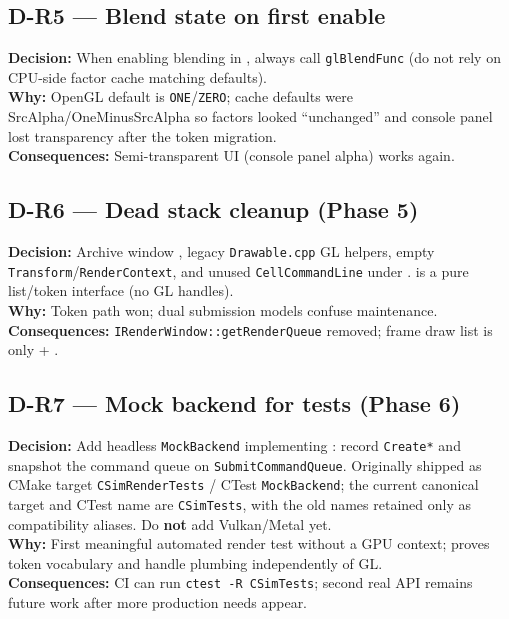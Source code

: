 \subsection*{D-R5 --- Blend state on first enable}
\begin{decisionbox}[title={D-R5 \quad 2026-07-28}]
\textbf{Decision:} When enabling blending in ,
always call \texttt{glBlendFunc} (do not rely on CPU-side factor cache matching
defaults).\\
\textbf{Why:} OpenGL default is \texttt{ONE}/\texttt{ZERO}; cache defaults were
SrcAlpha/OneMinusSrcAlpha so factors looked ``unchanged'' and console panel
lost transparency after the token migration.\\
\textbf{Consequences:} Semi-transparent UI (console panel alpha) works again.
\end{decisionbox}

\subsection*{D-R6 --- Dead stack cleanup (Phase 5)}
\begin{decisionbox}[title={D-R6 \quad 2026-07-28}]
\textbf{Decision:} Archive window , legacy
\texttt{Drawable.cpp} GL helpers, empty \texttt{Transform}/\texttt{RenderContext},
and unused \texttt{CellCommandLine} under .
 is a pure list/token interface (no GL handles).\\
\textbf{Why:} Token path won; dual submission models confuse maintenance.\\
\textbf{Consequences:} \texttt{IRenderWindow::getRenderQueue} removed; frame
draw list is only  + .
\end{decisionbox}

\subsection*{D-R7 --- Mock backend for tests (Phase 6)}
\begin{decisionbox}[title={D-R7 \quad 2026-07-28}]
\textbf{Decision:} Add headless \texttt{MockBackend} implementing
: record \texttt{Create*} and snapshot the command queue
on \texttt{SubmitCommandQueue}. Originally shipped as CMake target
\texttt{CSimRenderTests} / CTest \texttt{MockBackend}; the current canonical
target and CTest name are \texttt{CSimTests}, with the old names retained only
as compatibility aliases. Do \textbf{not} add Vulkan/Metal yet.\\
\textbf{Why:} First meaningful automated render test without a GPU context;
proves token vocabulary and handle plumbing independently of GL.\\
\textbf{Consequences:} CI can run \texttt{ctest -R CSimTests}; second real API
remains future work after more production needs appear.
\end{decisionbox}

